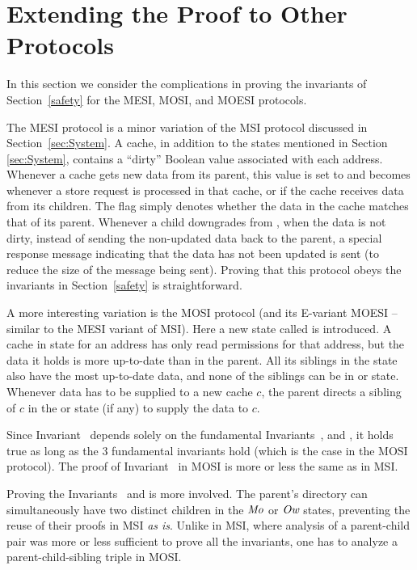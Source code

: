 \section{Extending the Proof to Other Protocols}
\label{sec:Refinements}

In this section we consider the complications in proving the invariants
of Section~\ref{safety} for the MESI, MOSI, and MOESI protocols.

The MESI protocol is a minor variation of the MSI protocol discussed in Section~\ref{sec:System}.
A cache, in addition to the states mentioned in Section
\ref{sec:System}, contains a ``dirty'' Boolean value associated with each
address.  Whenever a cache gets new data from its parent, this value is set to
\False{} and becomes \True{} whenever a store request is processed in that
cache, or if the cache receives data from its children. The flag simply denotes
whether the data in the cache matches that of its parent.  Whenever a
child downgrades from \Mo{}, when the data is not dirty, instead of sending the
non-updated data back to the parent, a special response message indicating that
the data has not been updated is sent (to reduce the size of the message being
sent). Proving that this protocol obeys the invariants in Section~\ref{safety}
is straightforward.

A more interesting variation is the MOSI protocol (and its E-variant MOESI --
similar to the MESI variant of MSI). Here a new state called \Ow{} is
introduced. A cache in \Ow{} state for an address has only read permissions for
that address, but the data it holds is more up-to-date than in the parent.  All
its siblings in the \Sh{} state also have the most up-to-date data, and none of
the siblings can be in \Mo{} or \Ow{} state.  Whenever data has to be supplied
to a new cache $c$, the parent directs a sibling of $c$ in the \Ow{} or \Mo{}
state (if any) to supply the data to $c$.

Since Invariant~ depends solely on the fundamental
Invariants~,  and , it
holds true as long as the 3 fundamental invariants hold (which is the case in
the MOSI protocol). The proof of Invariant~ in
MOSI is more or less the same as in MSI.

Proving the Invariants~ and
 is more involved. The parent's directory can
simultaneously have two distinct children in the $\textit{Mo}$ or $\textit{Ow}$ states,
preventing the reuse of their proofs in MSI \emph{as is}. Unlike in MSI, where
analysis of a parent-child pair was more or less sufficient to prove all the
invariants, one has to analyze a parent-child-sibling triple in MOSI.
